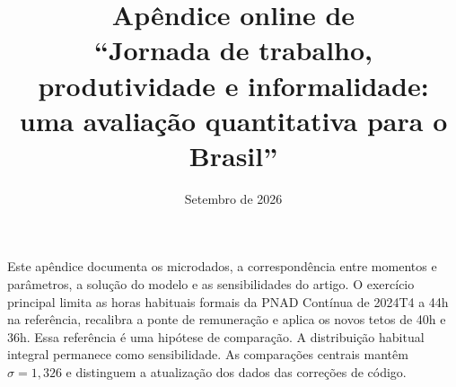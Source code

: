 \documentclass[12pt,a4paper]{article}
\title{Apêndice online de\\[3pt]
``Jornada de trabalho, produtividade e informalidade:\\
uma avaliação quantitativa para o Brasil''}
\author{}
\date{Setembro de 2026}
\begin{document}
\maketitle
Este apêndice documenta os microdados, a correspondência entre momentos e parâmetros, a solução do modelo e as sensibilidades do artigo. O exercício principal limita as horas habituais formais da PNAD Contínua de 2024T4 a 44h na referência, recalibra a ponte de remuneração e aplica os novos tetos de 40h e 36h. Essa referência é uma hipótese de comparação. A distribuição habitual integral permanece como sensibilidade. As comparações centrais mantêm $\sigma=1{,}326$ e distinguem a atualização dos dados das correções de código.
\setcounter{tocdepth}{1}
\hypersetup{bookmarksdepth=2}
\tableofcontents
\clearpage



\clearpage
\printbibliography
\end{document}
